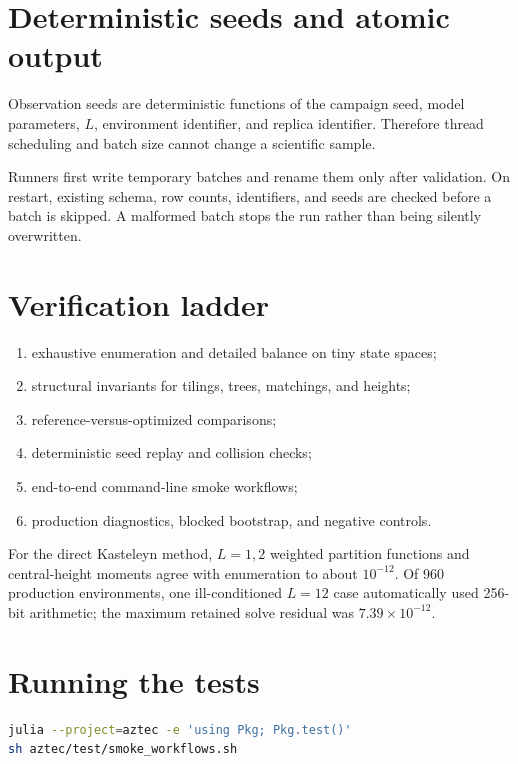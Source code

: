 \documentclass[11pt,a4paper,oneside,openany]{memoir}
\newcommand{\1}{\bm{1}}
\begin{document}
\section{Deterministic seeds and atomic output}

Observation seeds are deterministic functions of the campaign seed, model
parameters, $L$, environment identifier, and replica identifier. Therefore
thread scheduling and batch size cannot change a scientific sample.

Runners first write temporary batches and rename them only after validation.
On restart, existing schema, row counts, identifiers, and seeds are checked
before a batch is skipped. A malformed batch stops the run rather than being
silently overwritten.

\section{Verification ladder}

\begin{enumerate}
  \item exhaustive enumeration and detailed balance on tiny state spaces;
  \item structural invariants for tilings, trees, matchings, and heights;
  \item reference-versus-optimized comparisons;
  \item deterministic seed replay and collision checks;
  \item end-to-end command-line smoke workflows;
  \item production diagnostics, blocked bootstrap, and negative controls.
\end{enumerate}

For the direct Kasteleyn method, $L=1,2$ weighted partition functions and
central-height moments agree with enumeration to about $10^{-12}$. Of 960
production environments, one ill-conditioned $L=12$ case automatically used
256-bit arithmetic; the maximum retained solve residual was
$7.39\times10^{-12}$.

\section{Running the tests}

\begin{lstlisting}[language=bash]
julia --project=aztec -e 'using Pkg; Pkg.test()'
sh aztec/test/smoke_workflows.sh
\end{lstlisting}
\end{document}
